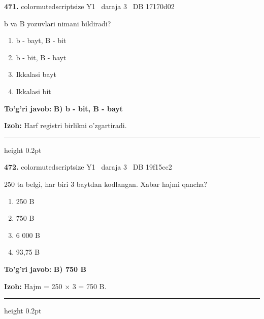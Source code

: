 \documentclass[10pt,a4paper,oneside]{article}
\begin{document}
\noindent\textbf{\color{ink}471.}  {color{muted}scriptsize Y1 \textbullet\ daraja 3 \textbullet\ DB 17170d02}
\par
b va B yozuvlari nimani bildiradi?
\begin{enumerate}[label=\Alph*),leftmargin=9mm]
\item b - bayt, B - bit
\item b - bit, B - bayt
\item Ikkalasi bayt
\item Ikkalasi bit
\end{enumerate}
\begin{tcolorbox}[enhanced,breakable,colback=teal!4,colframe=teal!50!black,boxrule=0.5pt,arc=1.1mm,left=3mm,right=3mm,top=1.7mm,bottom=1.7mm,before skip=2mm,after skip=2mm]
\textbf{\color{teal}To'g'ri javob:} \textbf{B) b - bit, B - bayt}
\par\smallskip
\textbf{Izoh:} Harf registri birlikni o'zgartiradi.
\end{tcolorbox}
\vspace{2mm}\hrule height 0.2pt \vspace{3mm}

\noindent\textbf{\color{ink}472.}  {color{muted}scriptsize Y1 \textbullet\ daraja 3 \textbullet\ DB 19f15cc2}
\par
250 ta belgi, har biri 3 baytdan kodlangan. Xabar hajmi qancha?
\begin{enumerate}[label=\Alph*),leftmargin=9mm]
\item 250 B
\item 750 B
\item 6 000 B
\item 93,75 B
\end{enumerate}
\begin{tcolorbox}[enhanced,breakable,colback=teal!4,colframe=teal!50!black,boxrule=0.5pt,arc=1.1mm,left=3mm,right=3mm,top=1.7mm,bottom=1.7mm,before skip=2mm,after skip=2mm]
\textbf{\color{teal}To'g'ri javob:} \textbf{B) 750 B}
\par\smallskip
\textbf{Izoh:} Hajm = 250 \ensuremath{\times} 3 = 750 B.
\end{tcolorbox}
\vspace{2mm}\hrule height 0.2pt \vspace{3mm}
\end{document}
